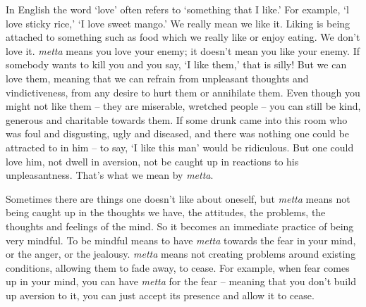 
In English the word `love' often refers to `something that I like.' For example, `l love sticky rice,' `I love sweet mango.' We really mean we like it. Liking is being attached to something such as food which we really like or enjoy eating. We don't love it. \textit{metta} means you love your enemy; it doesn't mean you like your enemy. If somebody wants to kill you and you say, `I like them,' that is silly! But we can love them, meaning that we can refrain from unpleasant thoughts and vindictiveness, from any desire to hurt them or annihilate them. Even though you might not like them -- they are miserable, wretched people -- you can still be kind, generous and charitable towards them. If some drunk came into this room who was foul and disgusting, ugly and diseased, and there was nothing one could be attracted to in him -- to say, `I like this man' would be ridiculous. But one could love him, not dwell in aversion, not be caught up in reactions to his unpleasantness. That's what we mean by \textit{metta}.

Sometimes there are things one doesn't like about oneself, but \textit{metta} means not being caught up in the thoughts we have, the attitudes, the problems, the thoughts and feelings of the mind. So it becomes an immediate practice of being very mindful. To be mindful means to have \textit{metta} towards the fear in your mind, or the anger, or the jealousy. \textit{metta} means not creating problems around existing conditions, allowing them to fade away, to cease. For example, when fear comes up in your mind, you can have \textit{metta} for the fear -- meaning that you don't build up aversion to it, you can just accept its presence and allow it to cease.

